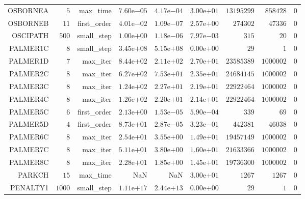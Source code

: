 \begin{longtable}{rrrrrrrrr}
OSBORNEA & \(     5\) & max\_time & \( 7.60\)e\(-05\) & \( 4.17\)e\(-04\) & \( 3.00\)e\(+01\) & \(13195299\) & \(858428\) & \(     0\) \\
OSBORNEB & \(    11\) & first\_order & \( 4.01\)e\(-02\) & \( 1.09\)e\(-07\) & \( 2.57\)e\(+00\) & \(274302\) & \( 47336\) & \(     0\) \\
OSCIPATH & \(   500\) & small\_step & \( 1.00\)e\(+00\) & \( 1.18\)e\(-06\) & \( 7.97\)e\(-03\) & \(   315\) & \(    20\) & \(     0\) \\
PALMER1C & \(     8\) & small\_step & \( 3.45\)e\(+08\) & \( 5.15\)e\(+08\) & \( 0.00\)e\(+00\) & \(    29\) & \(     1\) & \(     0\) \\
PALMER1D & \(     7\) & max\_iter & \( 8.44\)e\(+02\) & \( 2.11\)e\(+02\) & \( 2.70\)e\(+01\) & \(23585389\) & \(1000002\) & \(     0\) \\
PALMER2C & \(     8\) & max\_iter & \( 6.27\)e\(+02\) & \( 7.53\)e\(+01\) & \( 2.35\)e\(+01\) & \(24684145\) & \(1000002\) & \(     0\) \\
PALMER3C & \(     8\) & max\_iter & \( 1.24\)e\(+02\) & \( 2.27\)e\(+01\) & \( 2.19\)e\(+01\) & \(22922464\) & \(1000002\) & \(     0\) \\
PALMER4C & \(     8\) & max\_iter & \( 1.26\)e\(+02\) & \( 2.20\)e\(+01\) & \( 2.14\)e\(+01\) & \(22922464\) & \(1000002\) & \(     0\) \\
PALMER5C & \(     6\) & first\_order & \( 2.13\)e\(+00\) & \( 1.53\)e\(-05\) & \( 5.90\)e\(-04\) & \(   339\) & \(    69\) & \(     0\) \\
PALMER5D & \(     4\) & first\_order & \( 8.73\)e\(+01\) & \( 2.87\)e\(-05\) & \( 3.23\)e\(-01\) & \(442381\) & \( 46038\) & \(     0\) \\
PALMER6C & \(     8\) & max\_iter & \( 2.54\)e\(+01\) & \( 3.55\)e\(+00\) & \( 1.49\)e\(+01\) & \(19457149\) & \(1000002\) & \(     0\) \\
PALMER7C & \(     8\) & max\_iter & \( 5.11\)e\(+01\) & \( 3.80\)e\(+00\) & \( 1.60\)e\(+01\) & \(21633366\) & \(1000002\) & \(     0\) \\
PALMER8C & \(     8\) & max\_iter & \( 2.28\)e\(+01\) & \( 1.85\)e\(+00\) & \( 1.45\)e\(+01\) & \(19736300\) & \(1000002\) & \(     0\) \\
PARKCH & \(    15\) & max\_time &       NaN &       NaN & \( 3.00\)e\(+01\) & \(  1267\) & \(  1267\) & \(     0\) \\
PENALTY1 & \(  1000\) & small\_step & \( 1.11\)e\(+17\) & \( 2.44\)e\(+13\) & \( 0.00\)e\(+00\) & \(    29\) & \(     1\) & \(     0\) \\

\end{longtable}
